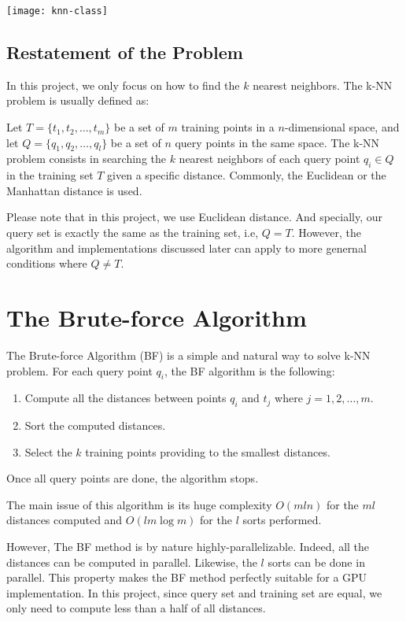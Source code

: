 \documentclass[11pt, a4paper]{article}
\makeatletter
\newcommand\fcaption{\def\@captype{figure}\caption}
\makeatother
\begin{document}
\begin{center}
    \texttt{[image: knn-class]}
    \fcaption{An example of k-NN based classification}\label{knn}
\end{center}

\subsection{Restatement of the Problem}

In this project, we only focus on how to find the $k$ nearest neighbors. The k-NN problem is usually defined as:

Let $T = \{t_1,t_2, \ldots ,t_m\}$ be a set of $m$ training points in a $n$-dimensional space, and let $Q = \{q_1,q_2, \ldots, q_l\}$ be a set of $n$ query points in the same space. The k-NN problem consists in searching the $k$ nearest neighbors of each query point $q_i \in Q$ in the training set $T$ given a specific distance. Commonly, the Euclidean or the Manhattan distance is used.

Please note that in this project, we use Euclidean distance. And specially, our query set is exactly the same as the training set, i.e, $Q=T$. However, the algorithm and implementations discussed later can apply to more genernal conditions where $Q \not= T$.

\section{The Brute-force Algorithm}

The Brute-force Algorithm (BF) is a simple and natural way to solve k-NN problem. For each query point $q_i$, the BF algorithm is the following:

\begin{enumerate}
    \item Compute all the distances between points $q_i$ and $t_j$ where $j = 1,2,\ldots, m$.
    \item Sort the computed distances.
    \item Select the $k$ training points providing to the smallest distances.
\end{enumerate}

Once all query points are done, the algorithm stops.

The main issue of this algorithm is its huge complexity $O(mln)$ for the $ml$ distances computed and $O(lm \log m)$ for the $l$ sorts performed.

However, The BF method is by nature highly-parallelizable. Indeed, all the distances can be computed in parallel. Likewise, the $l$ sorts can be done in parallel. This property makes the BF method perfectly suitable for a GPU implementation. In this project, since query set and training set are equal, we only need to compute less than a half of all distances.
\end{document}
